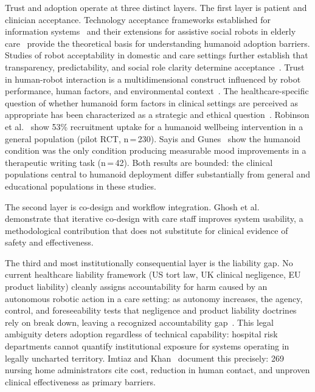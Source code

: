 Trust and adoption operate at three distinct layers. The first layer is patient
and clinician acceptance. Technology acceptance frameworks established for
information systems~\cite{venkatesh2003user} and their extensions for assistive
social robots in elderly care~\cite{heerink2010assessing,broadbent2017interactions}
provide the theoretical basis for understanding humanoid adoption barriers.
Studies of robot acceptability in domestic and care settings further establish
that transparency, predictability, and social role clarity determine
acceptance~\cite{young2009toward}.
Trust in human-robot interaction is a multidimensional construct influenced by
robot performance, human factors, and environmental
context~\cite{hancock2011meta,hancock2011trust,sciutti2018humanizing}. The healthcare-specific question of whether
humanoid form factors in clinical settings are perceived as appropriate has been
characterized as a strategic and ethical
question~\cite{ozturkcan2022humanoid}. Robinson et al.~\cite{robinson2023brief}
show 53\% recruitment uptake for a humanoid wellbeing intervention in a general
population (pilot RCT, n\,=\,230). Sayis and Gunes~\cite{sayis2024technology}
show the humanoid condition was the only condition producing measurable mood
improvements in a therapeutic writing task (n\,=\,42). Both results are bounded:
the clinical populations central to humanoid deployment differ substantially from
general and educational populations in these studies.

The second layer is co-design and workflow integration. Ghosh et
al.~\cite{ghosh2024usercentered} demonstrate that iterative co-design with care
staff improves system usability, a methodological contribution that does not
substitute for clinical evidence of safety and effectiveness.

The third and most institutionally consequential layer is the liability gap. No
current healthcare liability framework (US tort law, UK clinical negligence, EU
product liability) cleanly assigns accountability for harm caused by an autonomous
robotic action in a care setting: as autonomy increases, the agency, control, and
foreseeability tests that negligence and product liability doctrines rely on break
down, leaving a recognized accountability
gap~\cite{eldakak2024civil,solaiman2024regulating}. This legal ambiguity deters adoption regardless
of technical capability: hospital risk departments cannot quantify institutional
exposure for systems operating in legally uncharted territory. Imtiaz and
Khan~\cite{imtiaz2024perceptions} document this precisely: 269 nursing home
administrators cite cost, reduction in human contact, and unproven clinical
effectiveness as primary barriers.

